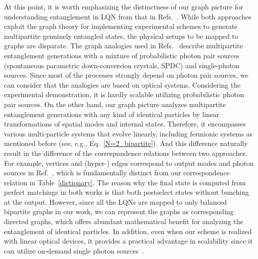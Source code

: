 \documentclass[a4paper,twocolumn,8pt,accepted=2021-12-15]{quantumarticle}
\begin{document}
	At this point, it is worth emphasizing the distinctness of our graph picture for understanding entanglement in LQN from that in Refs.~\cite{krenn2017quantum,gu2019quantum,gu2019quantum2,gu2020quantum}. While both approaches exploit the graph theory for implementing experimental schemes to generate multipartite genuinely entangled states, the physical setups to be mapped to graphs are disparate. The graph analogies used in Refs.~\cite{krenn2017quantum,gu2019quantum,gu2019quantum2,gu2020quantum} describe multipartite entanglement generations with a mixture of probabilistic photon pair sources (spontaneous parametric down-conversion crystals, SPDC) and single-photon sources. Since most of the processes strongly depend on photon pair sources, we can consider that the analogies are based on optical systems. Considering the experimental demonstration, it is hardly scalable utilizing probabilistic photon pair sources. On the other hand, our graph picture analyzes multipartite entanglement generations with any kind of identical particles by linear transformations of spatial modes and  internal states. Therefore, it encompasses various multi-particle systems that evolve linearly, including fermionic systems as mentioned before (see, e.g., Eq.~\eqref{N=2_bipartite}). And this difference naturally result in the difference of the correspondence relations between two approaches. For example, vertices and (hyper-) edges correspond to output modes and photon sources in  Ref.~\cite{krenn2017quantum,gu2019quantum,gu2019quantum2,gu2020quantum}, which is fundamentally distinct from our correspondence relation in Table~\ref{dictionary}. 
		The reason why the final state is computed from perfect matchings in both works is that both postselect states without bunching at the output. However, since all the LQNs are mapped to only balanced bipartite graphs in our work, we can represent the graphs as corresponding directed graphs, which offers abundant mathematical benefit for analyzing the entanglement of identical particles.
		In addition, even when our scheme is realized with linear optical devices, it provides a practical advantage in scalability since it can utilize on-demand single photon sources~\cite{lee2021entangling}.
	
\end{document}
